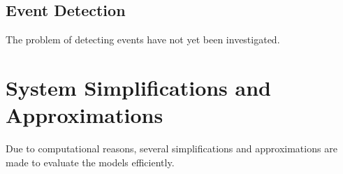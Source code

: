 

\subsection{Event Detection}
The problem of detecting events have not yet been investigated.

\section{System Simplifications and Approximations}
Due to computational reasons, several simplifications and
approximations are made to evaluate the models efficiently.

